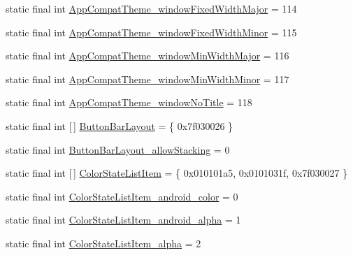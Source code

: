 \begin{DoxyCompactItemize}
\item 
static final int \mbox{\hyperlink{classandroid_1_1support_1_1v7_1_1appcompat_1_1R_1_1styleable_a985db90234eb62763be3a1d458eb7d90}{App\+Compat\+Theme\+\_\+window\+Fixed\+Width\+Major}} = 114
\item 
static final int \mbox{\hyperlink{classandroid_1_1support_1_1v7_1_1appcompat_1_1R_1_1styleable_ab05126bfb1793565c042a93809b9b8aa}{App\+Compat\+Theme\+\_\+window\+Fixed\+Width\+Minor}} = 115
\item 
static final int \mbox{\hyperlink{classandroid_1_1support_1_1v7_1_1appcompat_1_1R_1_1styleable_ab5e88d04afeab7ebae0a257a0422a70e}{App\+Compat\+Theme\+\_\+window\+Min\+Width\+Major}} = 116
\item 
static final int \mbox{\hyperlink{classandroid_1_1support_1_1v7_1_1appcompat_1_1R_1_1styleable_afe3027147df3f5fe89a3b87527006755}{App\+Compat\+Theme\+\_\+window\+Min\+Width\+Minor}} = 117
\item 
static final int \mbox{\hyperlink{classandroid_1_1support_1_1v7_1_1appcompat_1_1R_1_1styleable_ae4efadb126436382233b75342a8c001d}{App\+Compat\+Theme\+\_\+window\+No\+Title}} = 118
\item 
static final int \mbox{[}$\,$\mbox{]} \mbox{\hyperlink{classandroid_1_1support_1_1v7_1_1appcompat_1_1R_1_1styleable_a7c65a92be88c9f9803f46314aaabe499}{Button\+Bar\+Layout}} = \{ 0x7f030026 \}
\item 
static final int \mbox{\hyperlink{classandroid_1_1support_1_1v7_1_1appcompat_1_1R_1_1styleable_adf94e2a1bbfcc7e82913885952418e1a}{Button\+Bar\+Layout\+\_\+allow\+Stacking}} = 0
\item 
static final int \mbox{[}$\,$\mbox{]} \mbox{\hyperlink{classandroid_1_1support_1_1v7_1_1appcompat_1_1R_1_1styleable_ab1a10b8aa8b05ad84ba6100d75826b13}{Color\+State\+List\+Item}} = \{ 0x010101a5, 0x0101031f, 0x7f030027 \}
\item 
static final int \mbox{\hyperlink{classandroid_1_1support_1_1v7_1_1appcompat_1_1R_1_1styleable_a486c4fc28cfc21512b89a08c027a81b5}{Color\+State\+List\+Item\+\_\+android\+\_\+color}} = 0
\item 
static final int \mbox{\hyperlink{classandroid_1_1support_1_1v7_1_1appcompat_1_1R_1_1styleable_ad39e8bbfe1d8ff245e2181bd401b21ab}{Color\+State\+List\+Item\+\_\+android\+\_\+alpha}} = 1
\item 
static final int \mbox{\hyperlink{classandroid_1_1support_1_1v7_1_1appcompat_1_1R_1_1styleable_a4cd9be97c7ba37b33d80e30be11d4814}{Color\+State\+List\+Item\+\_\+alpha}} = 2
\item 

\end{DoxyCompactItemize}
